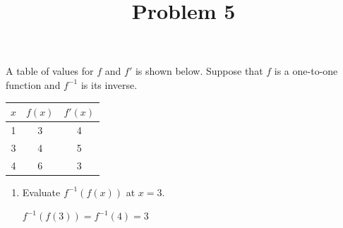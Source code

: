\documentclass{ximera}
\title[Problem 5]{Problem 5}
\begin{document}
\begin{abstract} \end{abstract}
\maketitle


\begin{problem}
  A table of values for $f$ and $f'$ is shown below.
  Suppose that $f$ is a one-to-one function and $f^{-1}$ is its inverse.
  \begin{center}
    \begin{tabular}{ccc}
\hline
      $x$ & $f(x)$ & $f'(x)$\\
\hline \hline
      1 & 3 & 4\\

      3 & 4 & 5\\

      4 & 6 & 3\\
\hline
    \end{tabular}
  \end{center}

  \begin{enumerate}
    \item Evaluate $f^{-1}(f(x))$ at $x = 3$.
\begin{explanation}
         $ f^{-1}(f(3)) = f^{-1}(4) = 3$
      \end{explanation}



\end{enumerate}
\end{problem}
\end{document}
